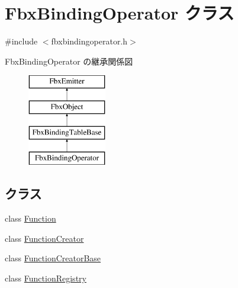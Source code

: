 \hypertarget{class_fbx_binding_operator}{}\section{Fbx\+Binding\+Operator クラス}
\label{class_fbx_binding_operator}


{\ttfamily \#include $<$fbxbindingoperator.\+h$>$}

Fbx\+Binding\+Operator の継承関係図\begin{figure}[H]
\begin{center}
\leavevmode
\includegraphics[height=4.000000cm]{class_fbx_binding_operator}
\end{center}
\end{figure}
\subsection*{クラス}
\begin{DoxyCompactItemize}
\item 
class \hyperlink{class_fbx_binding_operator_1_1_function}{Function}
\item 
class \hyperlink{class_fbx_binding_operator_1_1_function_creator}{Function\+Creator}
\item 
class \hyperlink{class_fbx_binding_operator_1_1_function_creator_base}{Function\+Creator\+Base}
\item 
class \hyperlink{class_fbx_binding_operator_1_1_function_registry}{Function\+Registry}
\end{DoxyCompactItemize}
